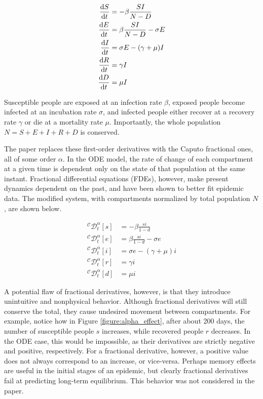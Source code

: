 \documentclass{article}
\begin{document}
	\begin{align}
		\dv{S}{t} &= -\beta \frac{S I}{N - D} \\
		\dv{E}{t} &= \beta \frac{S I}{N - D} - \sigma E \\
		\dv{I}{t} &= \sigma E - (\gamma + \mu) I \\
		\dv{R}{t} &= \gamma I \\
		\dv{D}{t} &= \mu I
	\end{align}
	
	Susceptible people are exposed at an infection rate $\beta$, exposed people become infected at an incubation rate $\sigma$, and infected people either recover at a recovery rate $\gamma$ or die at a mortality rate $\mu$. Importantly, the whole population $N = S + E + I + R + D$ is conserved.
	
	The paper replaces these first-order derivatives with the Caputo fractional ones, all of some order $\alpha$. In the ODE model, the rate of change of each compartment at a given time is dependent only on the state of that population at the same instant. Fractional differential equations (FDEs), however, make present dynamics dependent on the past, and have been shown to better fit epidemic data. The modified system, with compartments normalized by total population $N$, are shown below.
	
	\begin{align}
		^{\mathcal{C}}\mathcal{D}_{t}^{\alpha} [s] &= -\beta \frac{s i}{1 - d} \\
		^{\mathcal{C}}\mathcal{D}_{t}^{\alpha} [e] &= \beta \frac{s i}{1 - d} - \sigma e \\
		^{\mathcal{C}}\mathcal{D}_{t}^{\alpha} [i] &= \sigma e - (\gamma + \mu) i \\
		^{\mathcal{C}}\mathcal{D}_{t}^{\alpha} [r] &= \gamma i \\
		^{\mathcal{C}}\mathcal{D}_{t}^{\alpha} [d] &= \mu i
	\end{align}
	
	A potential flaw of fractional derivatives, however, is that they introduce unintuitive and nonphysical behavior. Although fractional derivatives will still conserve the total, they cause undesired movement between compartments. For example, notice how in Figure \ref{figure:alpha_effect}, after about 200 days, the number of susceptible people $s$ increases, while recovered people $r$ decreases. In the ODE case, this would be impossible, as their derivatives are strictly negative and positive, respectively. For a fractional derivative, however, a positive value does not always correspond to an increase, or vice-versa. Perhaps memory effects are useful in the initial stages of an epidemic, but clearly fractional derivatives fail at predicting long-term equilibrium. This behavior was not considered in the paper.
	
\end{document}
